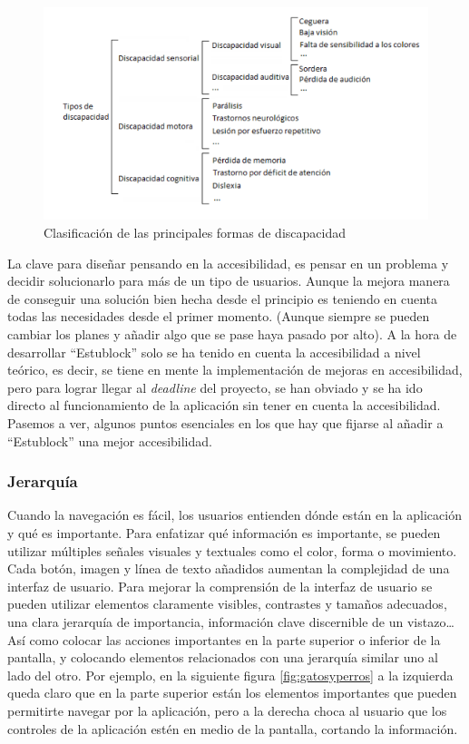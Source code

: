 \begin{figure}[h!]
  \centering
  \includegraphics[width=0.75\linewidth]{figs/Desarrollo/Accesibilidad/discapacidades}
  \caption[Clasificación de las principales formas de discapacidad]{Clasificación de las principales formas de discapacidad}
  \label{fig:discapacidad}
\end{figure}

La clave para diseñar pensando en la accesibilidad, es pensar en un problema y decidir solucionarlo para más de un tipo de usuarios. Aunque la mejora manera de conseguir una solución bien hecha desde el principio es teniendo en cuenta todas las necesidades desde el primer momento. (Aunque siempre se pueden cambiar los planes y añadir algo que se pase haya pasado por alto). A la hora de desarrollar ``Estublock'' solo se ha tenido en cuenta la accesibilidad a nivel teórico, es decir, se tiene en mente la implementación de mejoras en accesibilidad, pero para lograr llegar al \emph{deadline} del proyecto, se han obviado y se ha ido directo al funcionamiento de la aplicación sin tener en cuenta la accesibilidad. \\

Pasemos a ver, algunos puntos esenciales en los que hay que fijarse al añadir a ``Estublock'' una mejor accesibilidad.

\subsubsection{Jerarquía}
Cuando la navegación es fácil, los usuarios entienden dónde están en la aplicación y qué es importante. Para enfatizar qué información es importante, se pueden utilizar múltiples señales visuales y textuales como el color, forma o movimiento. Cada botón, imagen y línea de texto añadidos aumentan la complejidad de una interfaz de usuario. Para mejorar la comprensión de la interfaz de usuario se pueden utilizar elementos claramente visibles, contrastes y tamaños adecuados, una clara jerarquía de importancia, información clave discernible de un vistazo\dots Así como colocar las acciones importantes en la parte superior o inferior de la pantalla, y colocando elementos relacionados con una jerarquía similar uno al lado del otro. Por ejemplo, en la siguiente figura \ref{fig:gatosyperros} a la izquierda queda claro que en la parte superior están los elementos importantes que pueden permitirte navegar por la aplicación, pero a la derecha choca al usuario que los controles de la aplicación estén en medio de la pantalla, cortando la información. 

